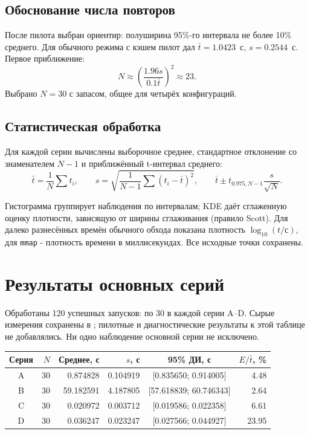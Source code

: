 \subsection{Обоснование числа повторов}
После пилота выбран ориентир: полуширина 95\%-го интервала не более
10\% среднего. Для обычного режима с кэшем пилот дал
$\bar t=1.0423$~с, $s=0.2544$~с. Первое приближение:
\[
N\approx\left(\frac{1.96s}{0.1\bar t}\right)^2\approx23.
\]
Выбрано $N=30$ с запасом, общее для четырёх конфигураций.

\subsection{Статистическая обработка}
Для каждой серии вычислены выборочное среднее, стандартное отклонение
со знаменателем $N-1$ и приближённый t-интервал среднего:
\[
\bar t=\frac1N\sum t_i,\qquad
s=\sqrt{\frac1{N-1}\sum(t_i-\bar t)^2},\qquad
\bar t\pm t_{0.975,N-1}\frac{s}{\sqrt N}.
\]

Гистограмма группирует наблюдения по интервалам; KDE даёт сглаженную
оценку плотности, зависящую от ширины сглаживания (правило Scott).
Для далеко разнесённых времён обычного обхода показана плотность
$\log_{10}(t/\text{с})$, для \texttt{mmap} - плотность времени
в миллисекундах. Все исходные точки сохранены.

\section{Результаты основных серий}
Обработаны 120 успешных запусков: по 30 в каждой серии A--D.
Сырые измерения сохранены в ;
пилотные и диагностические результаты к этой таблице не добавлялись.
Ни одно наблюдение основной серии не исключено.

\begin{center}\small
\begin{tabular}{|c|r|r|r|c|r|}\hline
Серия & $N$ & Среднее, с & $s$, с & 95\% ДИ, с & $E/\bar t$, \%\\ \hline
A & 30 & 0.874828 & 0.104919 & [0.835650; 0.914005] & 4.48 \\ \hline
B & 30 & 59.182591 & 4.187805 & [57.618839; 60.746343] & 2.64 \\ \hline
C & 30 & 0.020972 & 0.003712 & [0.019586; 0.022358] & 6.61 \\ \hline
D & 30 & 0.036247 & 0.023247 & [0.027566; 0.044927] & 23.95 \\ \hline
\end{tabular}\end{center}

